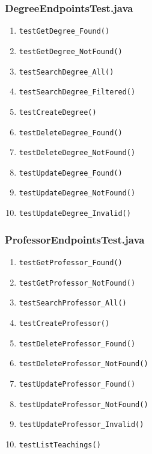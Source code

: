 \subsubsection{DegreeEndpointsTest.java}
\begin{enumerate}
	\renewcommand{\theenumi}{\arabic{enumi}}
	\renewcommand{\labelenumi}{\theenumi}
	\item \texttt{testGetDegree\_Found()} \label{test:testGetDegree_Found:Degree}
	\item \texttt{testGetDegree\_NotFound()} \label{test:testGetDegree_NotFound:Degree}
	\item \texttt{testSearchDegree\_All()} \label{test:testSearchDegree_All:Degree}
	\item \texttt{testSearchDegree\_Filtered()} \label{test:testSearchDegree_Filtered:Degree}
	\item \texttt{testCreateDegree()} \label{test:testCreateDegree:Degree}
	\item \texttt{testDeleteDegree\_Found()} \label{test:testDeleteDegree_Found:Degree}
	\item \texttt{testDeleteDegree\_NotFound()} \label{test:testDeleteDegree_NotFound:Degree}
	\item \texttt{testUpdateDegree\_Found()} \label{test:testUpdateDegree_Found:Degree}
	\item \texttt{testUpdateDegree\_NotFound()} \label{test:testUpdateDegree_NotFound:Degree}
	\item \texttt{testUpdateDegree\_Invalid()} \label{test:testUpdateDegree_Invalid:Degree}
\end{enumerate}

\subsubsection{ProfessorEndpointsTest.java}
\begin{enumerate}
	\renewcommand{\theenumi}{\arabic{enumi}}
	\renewcommand{\labelenumi}{\theenumi}
	\item \texttt{testGetProfessor\_Found()} \label{test:testGetProfessor_Found:Prof}
	\item \texttt{testGetProfessor\_NotFound()} \label{test:testGetProfessor_NotFound:Prof}
	\item \texttt{testSearchProfessor\_All()} \label{test:testSearchProfessor_All:Prof}
	\item \texttt{testCreateProfessor()} \label{test:testCreateProfessor:Prof}
	\item \texttt{testDeleteProfessor\_Found()} \label{test:testDeleteProfessor_Found:Prof}
	\item \texttt{testDeleteProfessor\_NotFound()} \label{test:testDeleteProfessor_NotFound:Prof}
	\item \texttt{testUpdateProfessor\_Found()} \label{test:testUpdateProfessor_Found:Prof}
	\item \texttt{testUpdateProfessor\_NotFound()} \label{test:testUpdateProfessor_NotFound:Prof}
	\item \texttt{testUpdateProfessor\_Invalid()} \label{test:testUpdateProfessor_Invalid:Prof}
	\item \texttt{testListTeachings()} \label{test:testListTeachings:Prof}
\end{enumerate}

